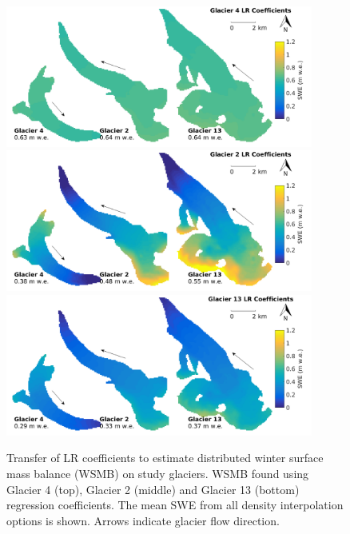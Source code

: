 \documentclass[12pt]{article}
\begin{document}
\pagebreak
\begin{figure}[H]
	\centering
	\includegraphics[width =0.9\textwidth]{MapTransferabilityG4Coeffs.png}\\
	\includegraphics[width =0.9\textwidth]{MapTransferabilityG2Coeffs.png}\\
	\includegraphics[width =0.9\textwidth]{MapTransferabilityG13Coeffs.png}\\
	\caption{Transfer of LR coefficients to estimate distributed winter surface mass balance (WSMB) on study glaciers. WSMB found using Glacier 4 (top), Glacier 2 (middle) and Glacier 13 (bottom) regression coefficients. The mean SWE from all density interpolation options is shown. Arrows indicate glacier flow direction.}
	\label{fig:MapTransferabilityGlaciersMean}
\end{figure}
\end{document}
